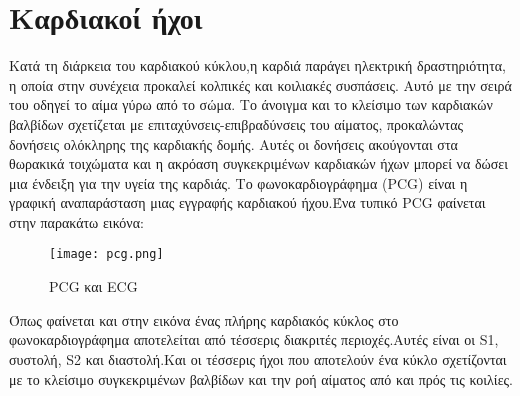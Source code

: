 \section{Καρδιακοί ήχοι}

Κατά τη διάρκεια του καρδιακού κύκλου,η καρδιά παράγει ηλεκτρική δραστηριότητα,
η οποία στην συνέχεια προκαλεί κολπικές και κοιλιακές συσπάσεις. Αυτό με την
σειρά του οδηγεί το αίμα γύρω από το σώμα. Το άνοιγμα και το κλείσιμο των
καρδιακών βαλβίδων σχετίζεται με επιταχύνσεις-επιβραδύνσεις του αίματος,
προκαλώντας δονήσεις ολόκληρης της καρδιακής δομής. Αυτές οι δονήσεις ακούγονται
στα θωρακικά τοιχώματα και η ακρόαση συγκεκριμένων καρδιακών ήχων μπορεί να
δώσει μια ένδειξη για την υγεία της καρδιάς. Το φωνοκαρδιογράφημα (PCG) είναι η
γραφική αναπαράσταση μιας εγγραφής καρδιακού ήχου.Ένα τυπικό PCG φαίνεται στην
παρακάτω εικόνα:

\begin{figure}[H]
	\texttt{[image: pcg.png]}
	\caption{PCG και ECG}
	\label{PCG}
\end{figure}

Όπως φαίνεται και στην εικόνα ένας πλήρης καρδιακός κύκλος στο φωνοκαρδιογράφημα
αποτελείται από τέσσερις διακριτές περιοχές.Αυτές είναι οι S1, συστολή, S2 και
διαστολή.Και οι τέσσερις ήχοι που αποτελούν ένα κύκλο σχετίζονται με το κλείσιμο
συγκεκριμένων βαλβίδων και την ροή αίματος από και πρός τις κοιλίες.
